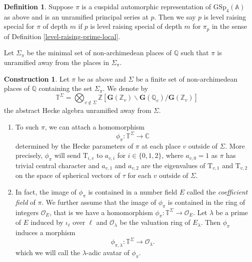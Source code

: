 \documentclass[10pt]{amsart}
\numberwithin{equation}{section}
\theoremstyle{definition}
\newtheorem{construction}[equation]{Construction}
\newtheorem{definition}[equation]{Definition}
\def\GSp{\mathrm{GSp}}
\def\calO{\mathcal{O}}
\def\CC{\mathbb{C}}
\def\bfG{\mathbf{G}}
\def\QQ{\mathbb{Q}}
\def\TT{\mathbb{T}}
\def\ZZ{\mathbb{Z}}
\def\rmT{\mathrm{T}}
\begin{document}
\begin{definition}\label{level-raise-prime}
Suppose $\pi$ is a cuspidal automorphic representation of $\GSp_{4}(\mathbb{A})$ as above and is an unramified principal series at $p$. Then we say $p$ is level raising special for $\pi$ of depth $m$ if $p$ is level raising special of depth $m$ for $\pi_{p}$ in the sense of Definition \ref{level-raising-prime-local}.
\end{definition}

 Let $\Sigma_{\pi}$ be the minimal set of non-archimedean places of $\QQ$ such that $\pi$ is unramified away from the places in $\Sigma_{\pi}$.
\begin{construction}\label{Hecke-Algebra}
Let $\pi$ be as above and $\Sigma$ be a finite set of non-archimedean places of $\QQ$ containing the set $\Sigma_{\pi}$.  We denote by
\begin{equation*}
\TT^{\Sigma}=\bigotimes_{v\not\in \Sigma}\ZZ[\bfG(\ZZ_{v})\backslash\bfG(\QQ_{v})/\bfG(\ZZ_{v})]
\end{equation*}
the abstract Hecke algebra unramified away from $\Sigma$. 
\begin{enumerate}
\item To such $\pi$, we can attach a homomorphism
\begin{equation*}
\phi_{\pi}: \TT^{\Sigma}\rightarrow \CC
\end{equation*}
determined by the Hecke parameters of $\pi$ at each place $v$ outside of $\Sigma$.  More precisely, $\phi_{\pi}$ will send 
$\rmT_{i, v}$ to $a_{v, i}$ for $i\in\{0, 1, 2\}$, where $a_{v, 0}=1$ as $\pi$ has trivial central character and $a_{v,1}$ and $a_{v,2}$ are the eigenvalues of $\rmT_{v,1}$ and $\rmT_{v, 2}$ on the space of spherical vectors of $\tau$ for each $v$ outside of $\Sigma$.

\item In fact, the image of $\phi_{\pi}$ is contained in a number field $E$ called the {\em coefficient field} of $\pi$.  We further assume that the image of $\phi_{\pi}$ is contained in the ring of integers $\calO_{E}$, that is we have a homomorphism
$\phi_{\pi}: \TT^{\Sigma}\rightarrow \calO_{E}$. Let $\lambda$ be a prime of $E$ induced by $\iota_{\ell}$ over $\ell$ and $\calO_{\lambda}$ be the valuation ring of $E_{\lambda}$. Then $\phi_{\pi}$ induces a morphism
\begin{equation*}
\phi_{\pi,\lambda}: \TT^{\Sigma}\rightarrow \calO_{\lambda}.
\end{equation*} 
which we will call the $\lambda$-adic avatar of $\phi_{\pi}$. 


\end{enumerate}
\end{construction}
\end{document}
